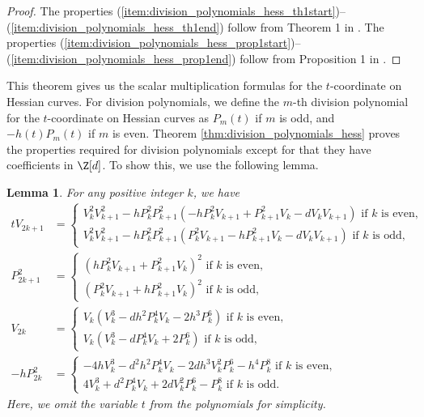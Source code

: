 \documentclass{amsart}
\newtheorem{lemma}[theorem]{Lemma}
\theoremstyle{definition}
\theoremstyle{remark}
\numberwithin{equation}{section}
\begin{document}
\begin{proof}
    The properties (\ref{item:division_polynomials_hess_th1start})--(\ref{item:division_polynomials_hess_th1end})
    follow from Theorem 1 in \cite{FouazouLontouo2023}.
    The properties (\ref{item:division_polynomials_hess_prop1start})--(\ref{item:division_polynomials_hess_prop1end})
    follow from Proposition 1 in \cite{FouazouLontouo2023}.
\end{proof}
This theorem gives us the scalar multiplication formulas
for the $t$-coordinate on Hessian curves.
For division polynomials,
we define the $m$-th division polynomial for the $t$-coordinate on Hessian curves
as $P_m(t)$ if $m$ is odd,
and $-h(t) P_m(t)$ if $m$ is even.
Theorem \ref{thm:division_polynomials_hess}
proves the properties required for division polynomials
except for that they have coefficients in $\Z[d]$.
To show this,
we use the following lemma.
\begin{lemma}\label{lem:division_polynomials_hess_recursion}
    For any positive integer $k$,
    we have
    \begin{align*}
        tV_{2k+1} &= \begin{cases}
                    V_k^2V_{k+1}^2 - hP_k^2 P_{k+1}^2
                        (-hP_k^2V_{k+1} + P_{k+1}^2 V_k - dV_kV_{k+1})
                    \text{ if $k$ is even,}\\
                    V_k^2 V_{k+1}^2 - hP_k^2 P_{k+1}^2
                        (P_k^2 V_{k+1} - hP_{k+1}^2 V_k - dV_k V_{k+1})
                    \text{ if $k$ is odd,}
                \end{cases}\\
        P_{2k+1}^2 &= \begin{cases}
                    (hP_k^2V_{k+1} + P_{k+1}^2 V_k)^2
                    \text{ if $k$ is even,}\\
                    (P_k^2 V_{k+1} + hP_{k+1}^2 V_k)^2
                    \text{ if $k$ is odd,}
                \end{cases}\\
        V_{2k} &= \begin{cases}
                    V_k (V_k^3 - d h^2 P_k^4 V_k - 2 h^3 P_k^6)
                    \text{ if $k$ is even,}\\
                    V_k (V_k^3 - d P_k^4 V_k + 2 P_k^6)
                    \text{ if $k$ is odd,}
                \end{cases}\\
        -h P_{2k}^2 &= \begin{cases}
                    -4 h V_k^3 - d^2 h^2 P_k^4 V_k - 2 d h^3 V_k^2 P_k^6 - h^4 P_k^8
                    \text{ if $k$ is even,}\\
                    4 V_k^3 + d^2 P_k^4 V_k + 2 d V_k^2 P_k^6 - P_k^8
                    \text{ if $k$ is odd.}
                \end{cases}
    \end{align*}
    Here, we omit the variable $t$ from the polynomials for simplicity.
\end{lemma}
\end{document}
